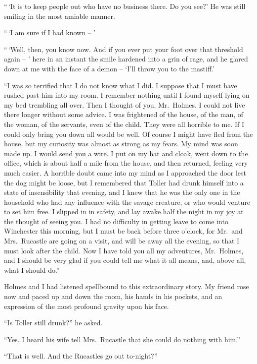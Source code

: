 “\,‘It is to keep people out who have no business there.
Do you see?’ He was still smiling in the most amiable
manner.

“\,‘I am sure if I had known -- ’

“\,‘Well, then, you know now. And if you ever put your
foot over that threshold again -- ’ here in an instant the
smile hardened into a grin of rage, and he glared down
at me with the face of a demon -- ‘I’ll throw you to the
mastiff.’

“I was so terrified that I do not know what I did. I suppose
that I must have rushed past him into my room. I remember
nothing until I found myself lying on my bed trembling
all over. Then I thought of you, Mr.~Holmes. I could not
live there longer without some advice. I was frightened of
the house, of the man, of the woman, of the servants, even of
the child. They were all horrible to me. If I could only
bring you down all would be well. Of course I might have
fled from the house, but my curiosity was almost as strong as
my fears. My mind was soon made up. I would send you a
wire. I put on my hat and cloak, went down to the office,
which is about half a mile from the house, and then returned,
feeling very much easier. A horrible doubt came into my
mind as I approached the door lest the dog might be loose,
but I remembered that Toller had drunk himself into a state
of insensibility that evening, and I knew that he was the only
one in the household who had any influence with the savage
creature, or who would venture to set him free. I slipped in
in safety, and lay awake half the night in my joy at the
thought of seeing you. I had no difficulty in getting leave to
come into Winchester this morning, but I must be back before
three o’clock, for Mr.~and Mrs.~Rucastle are going on a visit,
and will be away all the evening, so that I must look after the
child. Now I have told you all my adventures, Mr.~Holmes,
and I should be very glad if you could tell me what it all
means, and, above all, what I should do.”

Holmes and I had listened spellbound to this extraordinary
story. My friend rose now and paced up and down the room,
his hands in his pockets, and an expression of the most profound
gravity upon his face.

“Is Toller still drunk?” he asked.

“Yes. I heard his wife tell Mrs.~Rucastle that she could
do nothing with him.”

“That is well. And the Rucastles go out to-night?”

